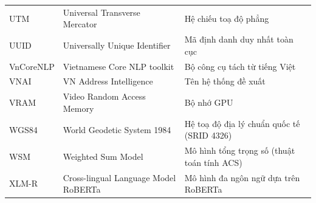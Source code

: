 \begin{longtable}{p{2.4cm} p{5.4cm} p{6.6cm}}
UTM         & Universal Transverse Mercator          & Hệ chiếu toạ độ phẳng \\
UUID        & Universally Unique Identifier          & Mã định danh duy nhất toàn cục \\
VnCoreNLP   & Vietnamese Core NLP toolkit            & Bộ công cụ tách từ tiếng Việt \\
VNAI        & VN Address Intelligence                & Tên hệ thống đề xuất \\
VRAM        & Video Random Access Memory             & Bộ nhớ GPU \\
WGS84       & World Geodetic System 1984             & Hệ toạ độ địa lý chuẩn quốc tế (SRID 4326) \\
WSM         & Weighted Sum Model                     & Mô hình tổng trọng số (thuật toán tính ACS) \\
XLM-R       & Cross-lingual Language Model RoBERTa    & Mô hình đa ngôn ngữ dựa trên RoBERTa \\
\bottomrule
\end{longtable}
